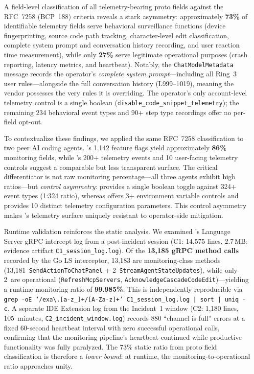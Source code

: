 A field-level classification of all telemetry-bearing proto fields against the RFC~7258 (BCP~188) criteria reveals a stark asymmetry: approximately \textbf{73\%} of identifiable telemetry fields serve behavioral surveillance functions (device fingerprinting, source code path tracking, character-level edit classification, complete system prompt and conversation history recording, and user reaction time measurement), while only \textbf{27\%} serve legitimate operational purposes (crash reporting, latency metrics, and heartbeat). Notably, the \texttt{ChatModelMetadata} message records the operator's \emph{complete system prompt}---including all Ring~3 user rules---alongside the full conversation history (L999--1019), meaning the vendor possesses the very rules it is overriding. The operator's only account-level telemetry control is a single boolean (\texttt{disable\_code\_snippet\_telemetry}); the remaining 234 behavioral event types and 90+ step type recordings offer no per-field opt-out.

To contextualize these findings, we applied the same RFC~7258 classification to two peer AI coding agents. \statsig{}'s 1{,}142 feature flags yield approximately \textbf{86\%} monitoring fields, while \clearcut{}'s 200+ telemetry events and 10 user-facing telemetry controls suggest a comparable but less transparent surface. The critical differentiator is not raw monitoring percentage---all three agents exhibit high ratios---but \emph{control asymmetry}: \cortex{} provides a single boolean toggle against 324+ event types (1:324 ratio), whereas \statsig{} offers 3+ environment variable controls and \clearcut{} provides 10 distinct telemetry configuration parameters. This control asymmetry makes \cortex{}'s telemetry surface uniquely resistant to operator-side mitigation.

Runtime validation reinforces the static analysis. We examined \cortex{}'s Language Server gRPC intercept log from a post-incident session (C1: 14{,}575 lines, 2.7\,MB; evidence artifact \texttt{C1\_session\_log.log}). Of the \textbf{13{,}185 gRPC method calls} recorded by the Go LS interceptor, 13{,}183 are monitoring-class methods (13{,}181~\texttt{SendActionToChatPanel} + 2~\texttt{StreamAgentStateUpdates}), while only 2~are operational (\texttt{RefreshMcpServers}, \texttt{AcknowledgeCascadeCodeEdit})---yielding a runtime monitoring ratio of \textbf{99.985\%}. This is independently reproducible via \texttt{grep -oE '/exa\textbackslash{}.[a-z\_]+/[A-Za-z]+' C1\_session\_log.log | sort | uniq -c}. A separate IDE Extension log from the Incident~1 window (C2: 1{,}180 lines, 105~minutes, \texttt{C2\_incident\_window.log}) records 880 ``channel is full'' errors at a fixed \mbox{60-second} heartbeat interval with zero successful operational calls, confirming that the monitoring pipeline's heartbeat continued while productive functionality was fully paralyzed. The 73\% static ratio from proto field classification is therefore a \emph{lower bound}: at runtime, the monitoring-to-operational ratio approaches unity.

